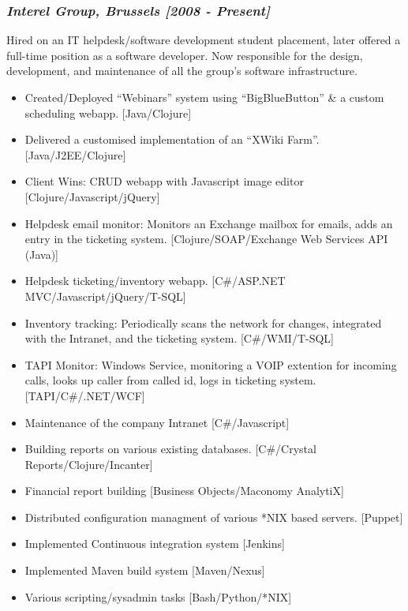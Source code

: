 \documentclass{article}
\begin{document}
\subsubsection*{\emph{Interel Group, Brussels  [2008 - Present]}}
Hired on an IT helpdesk/software development student placement,
          later offered a full-time position as a software developer. Now
          responsible for the design, development, and maintenance of all the
          group's software infrastructure.
\begin{itemize}
\item Created/Deployed ``Webinars'' system using ``BigBlueButton'' \& a
            custom scheduling webapp. [Java/Clojure]
\item Delivered a customised implementation of an ``XWiki Farm''.
            [Java/J2EE/Clojure]
\item Client Wins: CRUD webapp with Javascript image editor
            [Clojure/Javascript/jQuery]
\item Helpdesk email monitor: Monitors an Exchange mailbox for emails,
            adds an entry in the ticketing system.
            [Clojure/SOAP/Exchange Web Services API (Java)]
\item Helpdesk ticketing/inventory webapp.
            [C\#/ASP.NET MVC/Javascript/jQuery/T-SQL]
\item Inventory tracking: Periodically scans the network for changes,
            integrated with the Intranet, and the ticketing system.
        [C\#/WMI/T-SQL]
\item TAPI Monitor: Windows Service, monitoring a VOIP extention for
            incoming calls, looks up caller from called id, logs in ticketing
            system. [TAPI/C\#/.NET/WCF]
\item Maintenance of the company Intranet [C\#/Javascript]
\item Building reports on various existing databases.
            [C\#/Crystal Reports/Clojure/Incanter]
\item Financial report building [Business Objects/Maconomy AnalytiX]
\item Distributed configuration managment of various *NIX based servers.
            [Puppet]
\item Implemented Continuous integration system [Jenkins]
\item Implemented Maven build system [Maven/Nexus]
\item Various scripting/sysadmin tasks [Bash/Python/*NIX]
\end{itemize}
\end{document}
